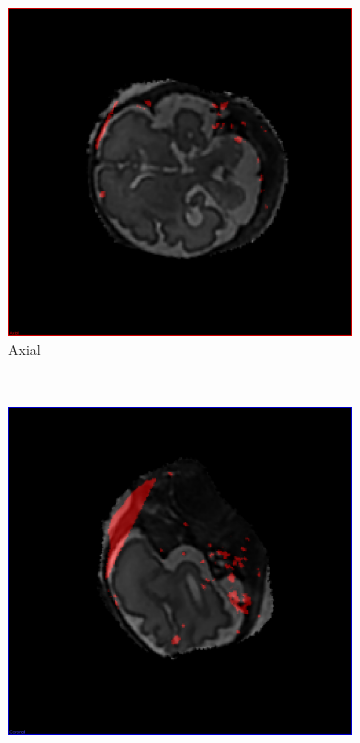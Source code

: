 \begin{figure}[H]
  \centering
  \begin{subfigure}[b]{0.3\textwidth}
    \includegraphics[width=\textwidth]{images/thresholding/thresholding_2d_axial.png}
    \caption{Axial}
    \label{fig:thresholding2daxial}
  \end{subfigure}%
  ~ %
  \begin{subfigure}[b]{0.3\textwidth}
    \includegraphics[width=\textwidth]{images/thresholding/thresholding_2d_coronal.png}

\end{subfigure}
\end{figure}
